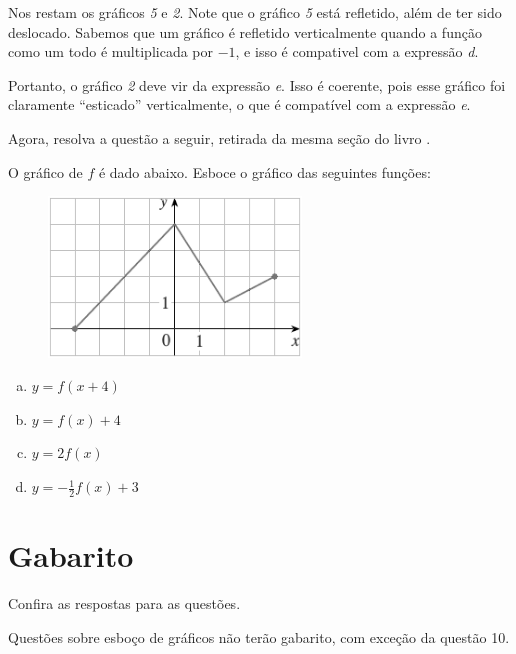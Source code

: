 \documentclass[main.tex]{subfiles}
\begin{document}
Nos restam os gráficos \textit{5} e \textit{2}. Note que o gráfico \textit{5} está refletido, além de ter sido deslocado. Sabemos que um gráfico é refletido verticalmente quando a função como um todo é multiplicada por $-1$, e isso é compativel com a expressão \textit{d}.

Portanto, o gráfico \textit{2} deve vir da expressão \textit{e}. Isso é coerente, pois esse gráfico foi claramente ``esticado'' verticalmente, o que é compatível com a expressão \textit{e}.

Agora, resolva a questão a seguir, retirada da mesma seção do livro .

\begin{resolva}
O gráfico de $f$ é dado abaixo. Esboce o gráfico das seguintes funções:

\begin{figure}[h]
\centering
\includegraphics[width=0.6\textwidth]{./img/c7r2.png}
\end{figure}

\begin{enumerate}[a)]
\item $y=f(x+4)$
\item $y=f(x)+4$
\item $y=2f(x)$
\item $y= -\frac{1}{2}f(x)+3$
\end{enumerate}
\end{resolva}

\section{Gabarito}

Confira as respostas para as questões.

Questões sobre esboço de gráficos não terão gabarito, com exceção da questão 10.

\imprimeGabarito

\paraAlunos
\end{document}
